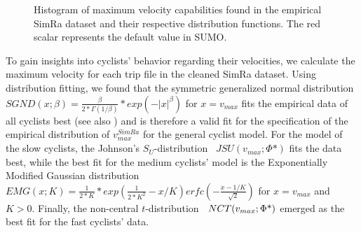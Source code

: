 \begin{figure}
    \centering
    \hfill
    \caption{%
        Histogram of maximum velocity capabilities found in the empirical SimRa dataset and their respective distribution functions.
        The red scalar represents the default value in SUMO.
    }%
    \label{fig:analysis_max_velo_dist_fit}
    \vspace{-.5em}
\end{figure}

To gain insights into cyclists' behavior regarding their velocities, we calculate the maximum velocity for each trip file in the cleaned SimRa dataset.
Using distribution fitting, we found that the symmetric generalized normal distribution~\cite{nadarajah2005generalized} $SGND(x;\beta) = \frac{\beta}{2*\Gamma(1/\beta)}*exp(-|x|^\beta)$ for $x=v_{max}$ fits the empirical data of all cyclists best (see also ) and is therefore a valid fit for the specification of the empirical distribution of $v_{max}^{SimRa}$ for the general cyclist model.
For the model of the slow cyclists, the Johnson's $S_{U}$-distribution~\cite{johnson1949systems} $JSU(v_{max}; \Phi\mbox{*})$ fits the data best, while the best fit for the medium cyclists' model is the Exponentially Modified Gaussian distribution~\cite{grushka1972characterization} $EMG(x; K) = \frac{1}{2*K}*exp(\frac{1}{2*K^2}-x/K)erfc(-\frac{x-1/K}{\sqrt{2}})$ for $x = v_{max}$ and $K>0$.
Finally, the non-central $t$-distribution~\cite{hogben1961moments} $NCT\newline(v_{max}; \Phi\mbox{*})$ emerged as the best fit for the fast cyclists' data.

